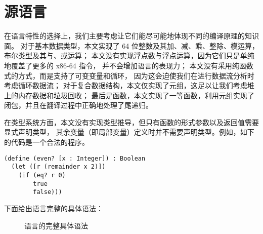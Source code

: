 
\chapter{源语言}

在语言特性的选择上，我们主要考虑让它们能尽可能地体现不同的编译原理的知识面。
对于基本数据类型，本文实现了 64 位整数及其加、减、乘、整除、模运算，布尔类型及其与、或运算；
本文没有实现浮点数与浮点运算，因为它们只是单纯地覆盖了更多的 x86-64 指令，
并不会增加语言的表现力；
本文没有采用纯函数式的方式，而是支持了可变变量和循环，
因为这会迫使我们在进行数据流分析时考虑循环数据流；
对于复合数据结构，本文仅实现了元组，这足以让我们考虑堆上的内存数据和垃圾回收；
最后是函数，本文实现了一等函数，利用元组实现了闭包，并且在翻译过程中正确地处理了尾递归。

在类型系统方面，本文没有实现类型推导，但只有函数的形式参数以及返回值需要显式声明类型，
其余变量（即局部变量）定义时并不需要声明类型。例如，如下的代码是一个合法的程序。
\begin{lstlisting}
(define (even? [x : Integer]) : Boolean
  (let ([r (remainder x 2)])
    (if (eq? r 0)
        true
        false)))
\end{lstlisting}

下面给出语言完整的具体语法：

\begin{figure}[h]
  \caption{语言的完整具体语法}
  \label{fig:full-con-syntax}
\end{figure}

